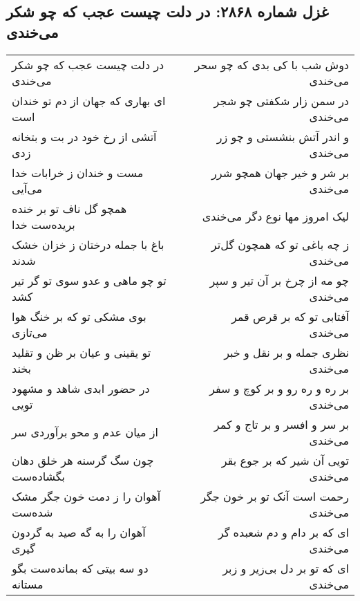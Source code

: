 \begin{center}
\section*{غزل شماره ۲۸۶۸: در دلت چیست عجب که چو شکر می‌خندی}
\label{sec:2868}
\begin{longtable}{l p{0.5cm} r}
در دلت چیست عجب که چو شکر می‌خندی
&&
دوش شب با کی بدی که چو سحر می‌خندی
\\
ای بهاری که جهان از دم تو خندان است
&&
در سمن زار شکفتی چو شجر می‌خندی
\\
آتشی از رخ خود در بت و بتخانه زدی
&&
و اندر آتش بنشستی و چو زر می‌خندی
\\
مست و خندان ز خرابات خدا می‌آیی
&&
بر شر و خیر جهان همچو شرر می‌خندی
\\
همچو گل ناف تو بر خنده بریده‌ست خدا
&&
لیک امروز مها نوع دگر می‌خندی
\\
باغ با جمله درختان ز خزان خشک شدند
&&
ز چه باغی تو که همچون گل‌تر می‌خندی
\\
تو چو ماهی و عدو سوی تو گر تیر کشد
&&
چو مه از چرخ بر آن تیر و سپر می‌خندی
\\
بوی مشکی تو که بر خنگ هوا می‌تازی
&&
آفتابی تو که بر قرص قمر می‌خندی
\\
تو یقینی و عیان بر ظن و تقلید بخند
&&
نظری جمله و بر نقل و خبر می‌خندی
\\
در حضور ابدی شاهد و مشهود تویی
&&
بر ره و ره رو و بر کوچ و سفر می‌خندی
\\
از میان عدم و محو برآوردی سر
&&
بر سر و افسر و بر تاج و کمر می‌خندی
\\
چون سگ گرسنه هر خلق دهان بگشاده‌ست
&&
تویی آن شیر که بر جوع بقر می‌خندی
\\
آهوان را ز دمت خون جگر مشک شده‌ست
&&
رحمت است آنک تو بر خون جگر می‌خندی
\\
آهوان را به گه صید به گردون گیری
&&
ای که بر دام و دم شعبده گر می‌خندی
\\
دو سه بیتی که بمانده‌ست بگو مستانه
&&
ای که تو بر دل بی‌زیر و زبر می‌خندی
\\
\end{longtable}
\end{center}
